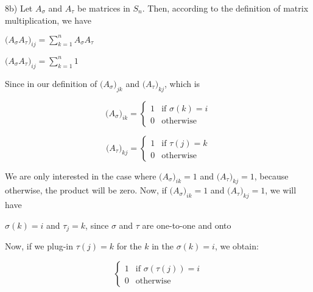 \documentclass[executivepaper]{article}
\begin{document}
\begin{flushleft}

8b) Let $A_{\sigma}$ and $A_{\tau}$ be matrices in $S_{n}$. Then, according to the definition of matrix multiplication, we have

\begin{center}

$\bigg(A_{\sigma} A_{\tau}\bigg)_{ij}=\sum_{k=1}^{n} A_{\sigma} A_{\tau}$

\vspace{1mm}

$\bigg(A_{\sigma} A_{\tau}\bigg)_{ij}=\sum_{k=1}^{n} 1$

\end{center}

Since in our definition of $\bigg(A_{\sigma}\bigg)_{jk}$ and $\bigg(A_{\tau}\bigg)_{kj}$, which is

\begin{center}

$$
\bigg(A_{\sigma}\bigg)_{ik}=
\begin{cases}
1 & \text{if } \text{$\sigma(k)=i$} \\
0 & \text{otherwise}
\end{cases}
$$

$$
\bigg(A_{\tau}\bigg)_{kj}=
\begin{cases}
1 & \text{if } \text{$\tau(j)=k$} \\
0 & \text{otherwise}
\end{cases}
$$

\end{center}

We are only interested in the case where $\bigg(A_{\sigma}\bigg)_{ik}=1$ and $\bigg(A_{\tau}\bigg)_{kj}=1$, because otherwise, the product will be zero. Now, if $\bigg(A_{\sigma}\bigg)_{ik}=1$ and $\bigg(A_{\tau}\bigg)_{kj}=1$, we will have 

\begin{center}

$\sigma(k)=i$ and $\tau_{j}=k$, since $\sigma$ and $\tau$ are one-to-one and onto

\end{center}

Now, if we plug-in $\tau(j)=k$ for the $k$ in the $\sigma(k)=i$, we obtain:

\begin{center}

$$
\begin{cases}
1 & \text{if } \text{$\sigma(\tau(j))=i$} \\
0 & \text{otherwise}
\end{cases}
$$


\end{center}
\end{flushleft}
\end{document}
